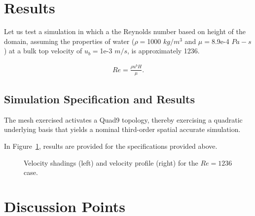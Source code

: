 \documentclass{article}
\begin{document}
\section{Results}


Let us test a simulation in which a the Reynolds number based on height of the domain,
assuming the properties of water ($\rho = $1000 $kg/m^3$ and $\mu = $8.9e-4 $Pa-s$)
at a bulk top velocity of $u_b = $1e-3 $m/s$, is approximately 1236.

\begin{align}
  Re = \frac{\rho u^b H}{\mu}.
\label{eq:muForm}
\end{align}

\subsection{Simulation Specification and Results}

The mesh exercised activates a Quad9 topology, thereby exercising a
quadratic underlying basis that yields a nominal third-order spatial accurate
simulation.

In Figure~\ref{fig:results}, results are provided for the specifications
provided above.

\begin{figure}[!htbp]
  \centering
  \centering
  \caption{Velocity shadings (left) and velocity profile (right) for the $Re = 1236$ case.}
  \label{fig:results}
\end{figure}

\section{Discussion Points}
\end{document}
